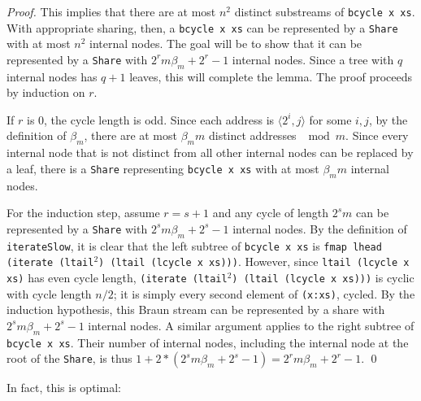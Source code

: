 \documentclass[envcountsect]{llncs}
\newcommand{\share}{{\tt Share} }
\begin{document}
\begin{proof}
This implies that there are at most $n^2$ distinct substreams of {\tt bcycle x xs}.
With appropriate sharing, then, a {\tt bcycle x xs} can be represented by a {\tt Share} with at most $n^2$ internal nodes.
The goal will be to show that it can be represented by a {\tt Share} with $2^r m \beta_m + 2^r - 1$ internal nodes.
Since a tree with $q$ internal nodes has $q+1$ leaves, this will complete the lemma.
The proof proceeds by induction on $r$. 

If $r$ is $0$, the cycle length is odd.
Since each address is $\langle 2^i,j \rangle$ for some $i, j$, by the definition of $\beta_m$, there are at most $\beta_m m$ distinct addresses $\mod m$.
Since every internal node that is not distinct from all other internal nodes can be replaced by a leaf, there is a {\tt Share} representing {\tt bcycle x xs} with at most $\beta_m m$ internal nodes.

For the induction step, assume $r = s+1$ and any cycle of length $2^s m$ can be represented by a \share with $2^s m \beta_m + 2^s - 1$ internal nodes.
By the definition of {\tt iterateSlow}, it is clear that the left subtree of {\tt bcycle x xs} is {\tt fmap lhead (iterate (ltail}$^2${\tt ) (ltail (lcycle x xs)))}.
However, since {\tt ltail (lcycle x xs)} has even cycle length, {\tt (iterate (ltail}$^2${\tt ) (ltail (lcycle x xs)))} is cyclic with cycle length $n/2$;
it is simply every second element of {\tt (x:xs)}, cycled.
By the induction hypothesis, this Braun stream can be represented by a share with $2^s m \beta_m + 2^s - 1$ internal nodes.
A similar argument applies to the right subtree of {\tt bcycle x xs}.
Their number of internal nodes, including the internal node at the root of the {\tt Share}, is thus $1+2*(2^s m \beta_m + 2^s - 1) = 2^r m \beta_m + 2^r - 1$.
\qed
\end{proof}

In fact, this is optimal:
\end{document}
